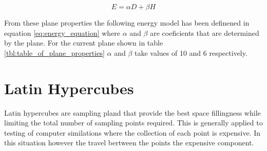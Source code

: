 \documentclass[a4paper,12pt,twoside]{article}
\begin{document}
\begin{equation}
\label{eq:energy_equation}
E=\alpha D + \beta H
\end{equation}

From these plane properties the following energy model has been definened in equation \ref{eq:energy_equation} where $\alpha$ and $\beta$ are coeficients that are determined by the plane. For the current plane shown in table \ref{tbl:table_of_plane_properties} $\alpha$ and $\beta$ take values of 10 and 6 respectively.

\section{Latin Hypercubes}
\label{sec:latin_hypercubes}

Latin hypercubes are sampling pland that provide the best space fillingness while limiting the total number of sampling points required. This is generally applied to testing of computer similations where the collection of each point is expensive. In this situation however the travel bertween the points the expensive component.
\end{document}
